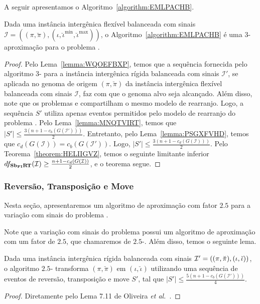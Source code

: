 A seguir apresentamos o Algoritmo~\ref{algorithm:EMLPACHB}.



\begin{theorem}\label{theorem:QISZKAHW}
Dada uma instância intergênica flexível balanceada com sinais $\mathcal{I} = ((\pi,\breve\pi),(\iota,\breve\iota^{\min},\breve\iota^{\max}))$, o Algoritmo~\ref{algorithm:EMLPACHB} é uma $3$-aproximação para o problema \SbFIRT{}.
\end{theorem}
\begin{proof}
Pelo Lema~\ref{lemma:WQOEFBXP}, temos que a sequência fornecida pelo algoritmo $3$-\SbIRT{} para a instância intergênica rígida balanceada com sinais $\mathcal{I'}$, se aplicada no genoma de origem $(\pi,\breve\pi)$ da instância intergênica flexível balanceada com sinais $\mathcal{I}$, faz com que o genoma alvo seja alcançado. Além disso, note que os problemas \SbIRT{} e \SbFIRT{} compartilham o mesmo modelo de rearranjo. Logo, a sequência $S'$ utiliza apenas eventos permitidos pelo modelo de rearranjo do problema \SbFIRT{}. Pelo Lema~\ref{lemma:MNQTVIRT}, temos que $|S'| \le \frac{3({n+1} - c_b(G(\mathcal{I}')))}{2}$. Entretanto, pelo Lema~\ref{lemma:PSGXFVHD}, temos que $c_d(G(\mathcal{I})) = c_b(G(\mathcal{I}'))$. Logo, $|S'| \le \frac{3({n+1} - c_d(G(\mathcal{I})))}{2}$. Pelo Teorema~\ref{theorem:HELIIGVZ}, temos o seguinte limitante inferior $df_{\textbf{Sb\textsubscript{FI}RT}}(\mathcal{I}) \ge \frac{{n+1} - c_d(G(\mathcal{I}))}{2}$, e o teorema segue.
\end{proof}

\subsubsection{Reversão, Transposição e Move}

Nesta seção, apresentaremos um algoritmo de aproximação com fator $2.5$ para a variação com sinais do problema \SbFIRTM{}. 

Note que a variação com sinais do problema \SbIRTM{} possui um algoritmo de aproximação com um fator de $2.5$, que chamaremos de $2.5$-\SbIRTM{}. Além disso, temos o seguinte lema.

\begin{lemma}\label{lemma:TPROVWMO}
Dada uma instância intergênica rígida balanceada com sinais $\mathcal{I}'=((\pi,\breve\pi),\break(\iota,\breve\iota))$, o algoritmo $2.5$-\SbIRTM{} transforma $(\pi,\breve\pi)$ em $(\iota,\breve\iota)$ utilizando uma sequência de eventos de reversão, transposição e move $S'$, tal que $|S'| \le \frac{5({n+1} - c_b(G(\mathcal{I}')))}{4}$.
\end{lemma}
\begin{proof}
Diretamente pelo Lema 7.11 de Oliveira \textit{et al.}~\cite{2021a-oliveira-etal}.
\end{proof}

